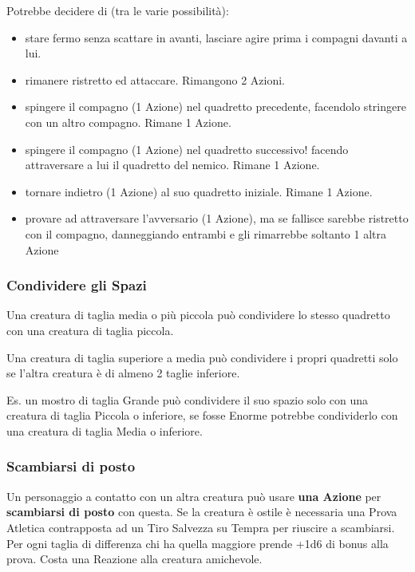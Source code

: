 \begin{multicols}{2}
\begin{giocatore}
Potrebbe decidere di (tra le varie possibilità):

\begin{itemize}[leftmargin=*] \setlength{\itemsep}{-1pt}
	\item stare fermo senza scattare in avanti, lasciare agire prima i compagni davanti a lui.
	\item rimanere ristretto ed attaccare. Rimangono 2 Azioni.
	\item spingere il compagno (1 Azione) nel quadretto precedente, facendolo stringere con un altro compagno. Rimane 1 Azione.
	\item spingere il compagno (1 Azione) nel quadretto successivo! facendo attraversare a lui il quadretto del nemico. Rimane 1 Azione.
	\item tornare indietro (1 Azione) al suo quadretto iniziale. Rimane 1 Azione.
	\item provare ad attraversare l'avversario (1 Azione), ma se fallisce sarebbe ristretto con il compagno, danneggiando entrambi e gli rimarrebbe soltanto 1 altra Azione
\end{itemize}

\end{giocatore}

\subsubsection{Condividere gli Spazi}\label{condividereglispazi}\hypertarget{condividereglispazi}{}

Una creatura di taglia media o più piccola può condividere lo stesso quadretto con una creatura di taglia piccola.

Una creatura di taglia superiore a media può condividere i propri quadretti solo se l'altra creatura è di almeno 2 taglie inferiore.

Es. un mostro di taglia Grande può condividere il suo spazio solo con una creatura di taglia Piccola o inferiore, se fosse Enorme potrebbe condividerlo con una creatura di taglia Media o inferiore.

\subsubsection{Scambiarsi di posto}
Un personaggio a contatto con un altra creatura può usare \textbf{una Azione} per \textbf{scambiarsi di posto} con questa. Se la creatura è ostile è necessaria una Prova Atletica contrapposta ad un Tiro Salvezza su Tempra per riuscire a scambiarsi. Per ogni taglia di differenza chi ha quella maggiore prende +1d6 di bonus alla prova. Costa una Reazione alla creatura amichevole.


\end{multicols}
